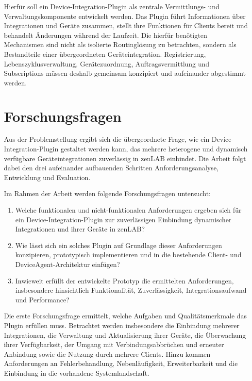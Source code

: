 Hierfür soll ein Device-Integration-Plugin als zentrale Vermittlungs- und Verwaltungskomponente entwickelt werden. Das Plugin führt Informationen über Integrationen und Geräte zusammen, stellt ihre Funktionen für Clients bereit und behandelt Änderungen während der Laufzeit. Die hierfür benötigten Mechanismen sind nicht als isolierte Routinglösung zu betrachten, sondern als Bestandteile einer übergeordneten Geräteintegration. Registrierung, Lebenszyklusverwaltung, Gerätezuordnung, Auftragsvermittlung und Subscriptions müssen deshalb gemeinsam konzipiert und aufeinander abgestimmt werden.

\section{Forschungsfragen}

Aus der Problemstellung ergibt sich die übergeordnete Frage, wie ein Device-Integration-Plugin gestaltet werden kann, das mehrere heterogene und dynamisch verfügbare Geräteintegrationen zuverlässig in zenLAB einbindet. Die Arbeit folgt dabei den drei aufeinander aufbauenden Schritten Anforderungsanalyse, Entwicklung und Evaluation.

Im Rahmen der Arbeit werden folgende Forschungsfragen untersucht:

\begin{enumerate}
\item Welche funktionalen und nicht-funktionalen Anforderungen ergeben sich für ein Device-Integration-Plugin zur zuverlässigen Einbindung dynamischer Integrationen und ihrer Geräte in zenLAB?
\item Wie lässt sich ein solches Plugin auf Grundlage dieser Anforderungen konzipieren, prototypisch implementieren und in die bestehende Client- und DeviceAgent-Architektur einfügen?
\item Inwieweit erfüllt der entwickelte Prototyp die ermittelten Anforderungen, insbesondere hinsichtlich Funktionalität, Zuverlässigkeit, Integrationsaufwand und Performance?
\end{enumerate}

Die erste Forschungsfrage ermittelt, welche Aufgaben und Qualitätsmerkmale das Plugin erfüllen muss. Betrachtet werden insbesondere die Einbindung mehrerer Integrationen, die Verwaltung und Aktualisierung ihrer Geräte, die Überwachung ihrer Verfügbarkeit, der Umgang mit Verbindungsabbrüchen und erneuter Anbindung sowie die Nutzung durch mehrere Clients. Hinzu kommen Anforderungen an Fehlerbehandlung, Nebenläufigkeit, Erweiterbarkeit und die Einbindung in die vorhandene Systemlandschaft.

